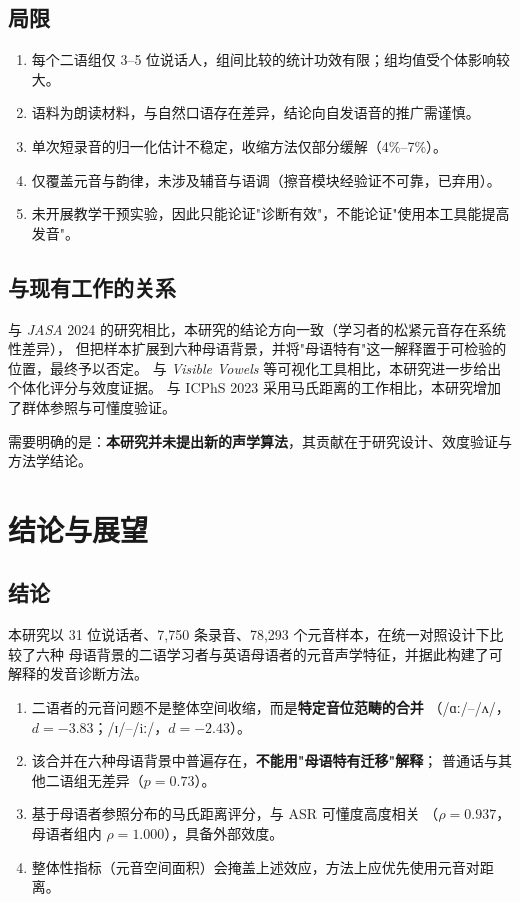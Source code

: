 \documentclass[12pt,a4paper,fontset=fandol]{ctexrep}
\newcommand{\ipa}[1]{/#1/}
\begin{document}
\section{局限}

\begin{enumerate}[leftmargin=2em,itemsep=2pt]
  \item 每个二语组仅 3--5 位说话人，组间比较的统计功效有限；组均值受个体影响较大。
  \item 语料为朗读材料，与自然口语存在差异，结论向自发语音的推广需谨慎。
  \item 单次短录音的归一化估计不稳定，收缩方法仅部分缓解（4\%--7\%）。
  \item 仅覆盖元音与韵律，未涉及辅音与语调（擦音模块经验证不可靠，已弃用）。
  \item 未开展教学干预实验，因此只能论证"诊断有效"，不能论证"使用本工具能提高发音"。
\end{enumerate}

\section{与现有工作的关系}

与 \textit{JASA} 2024 的研究相比，本研究的结论方向一致（学习者的松紧元音存在系统性差异），
但把样本扩展到六种母语背景，并将"母语特有"这一解释置于可检验的位置，最终予以否定。
与 \textit{Visible Vowels} 等可视化工具相比，本研究进一步给出个体化评分与效度证据。
与 ICPhS 2023 采用马氏距离的工作相比，本研究增加了群体参照与可懂度验证。

需要明确的是：\textbf{本研究并未提出新的声学算法}，其贡献在于研究设计、效度验证与
方法学结论。

\chapter{结论与展望}\label{ch:concl}

\section{结论}

本研究以 31 位说话者、7{,}750 条录音、78{,}293 个元音样本，在统一对照设计下比较了六种
母语背景的二语学习者与英语母语者的元音声学特征，并据此构建了可解释的发音诊断方法。

\begin{enumerate}[leftmargin=2em,itemsep=2pt]
  \item 二语者的元音问题不是整体空间收缩，而是\textbf{特定音位范畴的合并}
        （\ipa{ɑː}–\ipa{ʌ}，$d=-3.83$；\ipa{ɪ}–\ipa{iː}，$d=-2.43$）。
  \item 该合并在六种母语背景中普遍存在，\textbf{不能用"母语特有迁移"解释}；
        普通话与其他二语组无差异（$p=0.73$）。
  \item 基于母语者参照分布的马氏距离评分，与 ASR 可懂度高度相关
        （$\rho=0.937$，母语者组内 $\rho=1.000$），具备外部效度。
  \item 整体性指标（元音空间面积）会掩盖上述效应，方法上应优先使用元音对距离。
\end{enumerate}
\end{document}
